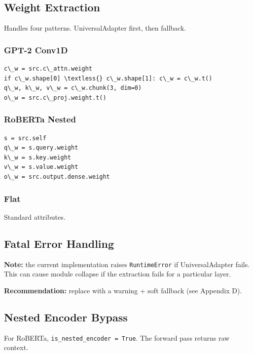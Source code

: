 \subsection{Weight Extraction}

Handles four patterns. UniversalAdapter first, then fallback.

\subsubsection{GPT-2 Conv1D}

\begin{lstlisting}
c\_w = src.c\_attn.weight
if c\_w.shape[0] \textless{} c\_w.shape[1]: c\_w = c\_w.t()
q\_w, k\_w, v\_w = c\_w.chunk(3, dim=0)
o\_w = src.c\_proj.weight.t()
\end{lstlisting}

\subsubsection{RoBERTa Nested}

\begin{lstlisting}
s = src.self
q\_w = s.query.weight
k\_w = s.key.weight
v\_w = s.value.weight
o\_w = src.output.dense.weight
\end{lstlisting}

\subsubsection{Flat}

Standard attributes.

\subsection{Fatal Error Handling}

\textbf{Note:} the current implementation raises \texttt{RuntimeError} if 
UniversalAdapter fails. This can cause module collapse if the extraction 
fails for a particular layer.

\textbf{Recommendation:} replace with a warning + soft fallback (see 
Appendix D).

\subsection{Nested Encoder Bypass}

For RoBERTa, \texttt{is\_nested\_encoder = True}. The forward pass returns raw 
context.

